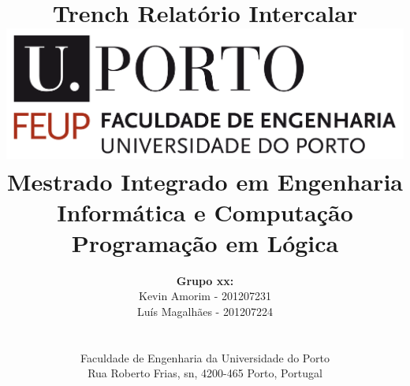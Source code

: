 \documentclass[a4paper]{article}
\begin{document}
\setlength{\textwidth}{16cm}
\setlength{\textheight}{22cm}

\title{\Huge\textbf{Trench}\linebreak\linebreak\linebreak
\Large\textbf{Relatório Intercalar}\linebreak\linebreak
\linebreak\linebreak
\includegraphics[scale=0.1]{feup-logo.png}\linebreak\linebreak
\linebreak\linebreak
\Large{Mestrado Integrado em Engenharia Informática e Computação} \linebreak\linebreak
\Large{Programação em Lógica}\linebreak
}

\author{\textbf{Grupo xx:}\\
Kevin Amorim - 201207231 \\
Luís Magalhães - 201207224 \\
\linebreak\linebreak \\
 \\ Faculdade de Engenharia da Universidade do Porto \\ Rua Roberto Frias, s\/n, 4200-465 Porto, Portugal \linebreak\linebreak\linebreak
\linebreak\linebreak\vspace{1cm}}

\maketitle
\thispagestyle{empty}
\end{document}
